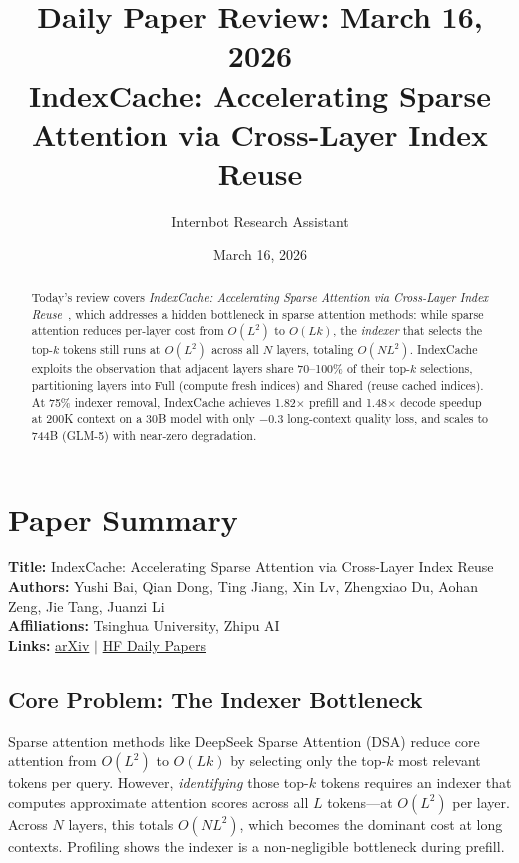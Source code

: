 \documentclass[11pt]{article}
\title{Daily Paper Review: March 16, 2026\\IndexCache: Accelerating Sparse Attention via Cross-Layer Index Reuse}
\author{Internbot Research Assistant}
\date{March 16, 2026}
\begin{document}
\maketitle

\begin{abstract}
Today's review covers \emph{IndexCache: Accelerating Sparse Attention via Cross-Layer Index Reuse}~\citep{bai2026indexcache}, which addresses a hidden bottleneck in sparse attention methods: while sparse attention reduces per-layer cost from $O(L^2)$ to $O(Lk)$, the \emph{indexer} that selects the top-$k$ tokens still runs at $O(L^2)$ across all $N$ layers, totaling $O(NL^2)$. IndexCache exploits the observation that adjacent layers share 70--100\% of their top-$k$ selections, partitioning layers into Full (compute fresh indices) and Shared (reuse cached indices). At 75\% indexer removal, IndexCache achieves 1.82$\times$ prefill and 1.48$\times$ decode speedup at 200K context on a 30B model with only $-$0.3 long-context quality loss, and scales to 744B (GLM-5) with near-zero degradation.
\end{abstract}

\section{Paper Summary}

\textbf{Title:} IndexCache: Accelerating Sparse Attention via Cross-Layer Index Reuse\\
\textbf{Authors:} Yushi Bai, Qian Dong, Ting Jiang, Xin Lv, Zhengxiao Du, Aohan Zeng, Jie Tang, Juanzi Li\\
\textbf{Affiliations:} Tsinghua University, Zhipu AI\\
\textbf{Links:}
\href{https://arxiv.org/abs/2603.12201}{arXiv} $\mid$
\href{https://huggingface.co/papers/2603.12201}{HF Daily Papers}

\subsection{Core Problem: The Indexer Bottleneck}

Sparse attention methods like DeepSeek Sparse Attention (DSA) reduce core attention from $O(L^2)$ to $O(Lk)$ by selecting only the top-$k$ most relevant tokens per query. However, \emph{identifying} those top-$k$ tokens requires an indexer that computes approximate attention scores across all $L$ tokens---at $O(L^2)$ per layer. Across $N$ layers, this totals $O(NL^2)$, which becomes the dominant cost at long contexts. Profiling shows the indexer is a non-negligible bottleneck during prefill.
\end{document}
